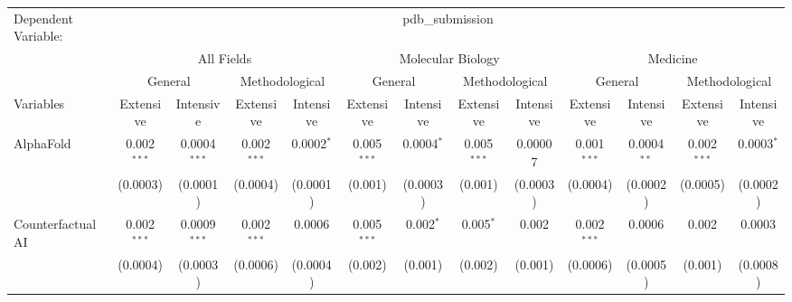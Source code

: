 \begingroup
\centering
\begin{tabular}{lcccccccccccc}
   \tabularnewline \midrule \midrule
   Dependent Variable: & \multicolumn{12}{c}{pdb\_submission}\\
 & \multicolumn{4}{c}{All Fields} & \multicolumn{4}{c}{Molecular Biology} & \multicolumn{4}{c}{Medicine} \\
\cmidrule(lr){2-5} \cmidrule(lr){6-9} \cmidrule(lr){10-13}
 & \multicolumn{2}{c}{General} & \multicolumn{2}{c}{Methodological} & \multicolumn{2}{c}{General} & \multicolumn{2}{c}{Methodological} & \multicolumn{2}{c}{General} & \multicolumn{2}{c}{Methodological} \\
\cmidrule(lr){2-3} \cmidrule(lr){4-5} \cmidrule(lr){6-7} \cmidrule(lr){8-9} \cmidrule(lr){10-11} \cmidrule(lr){12-13}
Variables & \multicolumn{1}{c}{Extensive} & \multicolumn{1}{c}{Intensive} & \multicolumn{1}{c}{Extensive} & \multicolumn{1}{c}{Intensive} & \multicolumn{1}{c}{Extensive} & \multicolumn{1}{c}{Intensive} & \multicolumn{1}{c}{Extensive} & \multicolumn{1}{c}{Intensive} & \multicolumn{1}{c}{Extensive} & \multicolumn{1}{c}{Intensive} & \multicolumn{1}{c}{Extensive} & \multicolumn{1}{c}{Intensive} \\
\cmidrule(lr){1-1}\cmidrule(lr){2-2} \cmidrule(lr){3-3} \cmidrule(lr){4-4} \cmidrule(lr){5-5} \cmidrule(lr){6-6} \cmidrule(lr){7-7} \cmidrule(lr){8-8} \cmidrule(lr){9-9} \cmidrule(lr){10-10} \cmidrule(lr){11-11} \cmidrule(lr){12-12} \cmidrule(lr){13-13}
   AlphaFold                                & 0.002$^{***}$  & 0.0004$^{***}$   & 0.002$^{***}$   & 0.0002$^{*}$    & 0.005$^{***}$  & 0.0004$^{*}$     & 0.005$^{***}$ & 0.00007         & 0.001$^{***}$ & 0.0004$^{**}$   & 0.002$^{***}$ & 0.0003$^{*}$\\   
                                            & (0.0003)       & (0.0001)         & (0.0004)        & (0.0001)        & (0.001)        & (0.0003)         & (0.001)       & (0.0003)        & (0.0004)      & (0.0002)        & (0.0005)      & (0.0002)\\   
   Counterfactual AI                        & 0.002$^{***}$  & 0.0009$^{***}$   & 0.002$^{***}$   & 0.0006          & 0.005$^{***}$  & 0.002$^{*}$      & 0.005$^{*}$   & 0.002           & 0.002$^{***}$ & 0.0006          & 0.002         & 0.0003\\   
                                            & (0.0004)       & (0.0003)         & (0.0006)        & (0.0004)        & (0.002)        & (0.001)          & (0.002)       & (0.001)         & (0.0006)      & (0.0005)        & (0.001)       & (0.0008)\\   

\end{tabular}

